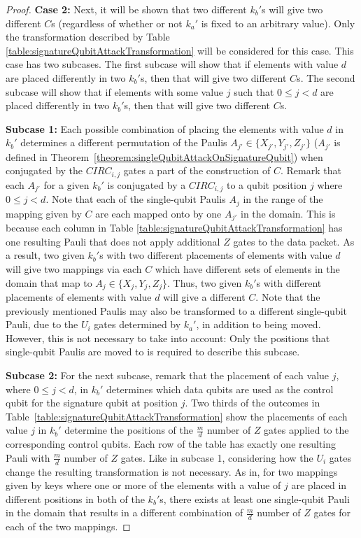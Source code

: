 \begin{proof}
\textbf{Case 2:} Next, it will be shown that two different $k_b'$s will give two different $C$s (regardless of whether or not $k_a'$ is fixed to an arbitrary value). Only the transformation described by Table \ref{table:signatureQubitAttackTransformation} will be considered for this case. This case has two subcases. The first subcase will show that if elements with value $d$ are placed differently in two $k_b'$s, then that will give two different $C$s. The second subcase will show that if elements with some value $j$ such that $0 \leq j < d$ are placed differently in two $k_b'$s, then that will give two different $C$s.

\textbf{Subcase 1:} Each possible combination of placing the elements with value $d$ in $k_b'$ determines a different permutation of the Paulis $A_{j'} \in \{X_{j'}, Y_{j'}, Z_{j'}\}$ ($A_{j'}$ is defined in Theorem~\ref{theorem:singleQubitAttackOnSignatureQubit}) when conjugated by the $\mathit{CIRC}_{i,j}$ gates a part of the construction of $C$. Remark that each $A_{j'}$ for a given $k_b'$ is conjugated by a $\mathit{CIRC}_{i,j}$ to a qubit position $j$ where $0 \leq j < d$. Note that each of the single-qubit Paulis $A_j$ in the range of the mapping given by $C$ are each mapped onto by one $A_{j'}$ in the domain. This is because each column in Table \ref{table:signatureQubitAttackTransformation} has one resulting Pauli that does not apply additional $Z$ gates to the data packet. As a result, two given $k_b'$s with two different placements of elements with value $d$ will give two mappings via each $C$ which have different sets of elements in the domain that map to $A_{j} \in \{X_{j}, Y_{j}, Z_{j}\}$. Thus, two given $k_b'$s with different placements of elements with value $d$ will give a different $C$. Note that the previously mentioned Paulis may also be transformed to a different single-qubit Pauli, due to the $U_i$ gates determined by $k_a'$, in addition to being moved. However, this is not necessary to take into account: Only the positions that single-qubit Paulis are moved to is required to describe this subcase. 

\textbf{Subcase 2:} For the next subcase, remark that the placement of each value $j$, where  $0 \leq j < d$, in $k_b'$ determines which data qubits are used as the control qubit for the signature qubit at position $j$. Two thirds of the outcomes in Table~\ref{table:signatureQubitAttackTransformation} show the placements of each value $j$ in $k_b'$ determine the positions of the $\frac{m}{d}$ number of $Z$ gates applied to the corresponding control qubits. Each row of the table has exactly one resulting Pauli with $\frac{m}{d}$ number of $Z$ gates. Like in subcase 1, considering how the $U_i$ gates change the resulting transformation is not necessary. As in, for two mappings given by keys where one or more of the elements with a value of $j$ are placed in different positions in both of the $k_b'$s, there exists at least one single-qubit Pauli in the domain that results in a different combination of $\frac{m}{d}$ number of $Z$ gates for each of the two mappings.


\end{proof}
